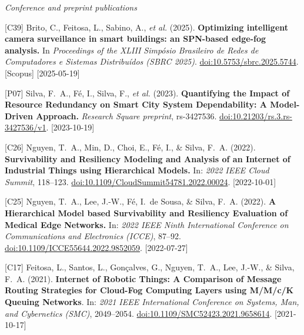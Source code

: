 {\begin{pubenumerate}
\end{pubenumerate}

\textit{Conference and preprint publications}
\begin{pubenumerate}
\item {\color{green}[C39]} Brito, C., Feitosa, L., Sabino, A., \textit{et al.} (2025). 
  \textbf{Optimizing intelligent camera surveillance in smart buildings: an SPN-based edge-fog analysis.} 
  In \textit{Proceedings of the XLIII Simp\'osio Brasileiro de Redes de Computadores e Sistemas Distribu\'idos (SBRC 2025)}. 
  \href{https://doi.org/10.5753/sbrc.2025.5744}{doi:10.5753/sbrc.2025.5744}. [Scopus] [2025-05-19]

\item {\color{blue}[P07]} Silva, F.\ A., F\'e, I., Silva, F., \textit{et al.} (2023). 
  \textbf{Quantifying the Impact of Resource Redundancy on Smart City System Dependability: A Model-Driven Approach.} 
  \textit{Research Square preprint}, rs-3427536. 
  \href{https://doi.org/10.21203/rs.3.rs-3427536/v1}{doi:10.21203/rs.3.rs-3427536/v1}. [2023-10-19]

\item {\color{green}[C26]} Nguyen, T.\ A., Min, D., Choi, E., F\'e, I., \& Silva, F.\ A. (2022). \textbf{Survivability and Resiliency Modeling and Analysis of an Internet of Industrial Things using Hierarchical Models.} In: \textit{2022 IEEE Cloud Summit}, 118--123. \href{https://doi.org/10.1109/CloudSummit54781.2022.00024}{doi:10.1109/CloudSummit54781.2022.00024}. [2022-10-01]

\item {\color{green}[C25]} Nguyen, T.\ A., Lee, J.-W., F\'e, I.\ de Sousa, \& Silva, F.\ A. (2022). \textbf{A Hierarchical Model based Survivability and Resiliency Evaluation of Medical Edge Networks.} In: \textit{2022 IEEE Ninth International Conference on Communications and Electronics (ICCE)}, 87--92. \href{https://doi.org/10.1109/ICCE55644.2022.9852059}{doi:10.1109/ICCE55644.2022.9852059}. [2022-07-27]

\item {\color{green}[C17]} Feitosa, L., Santos, L., Gon\c{c}alves, G., Nguyen, T.\ A., Lee, J.-W., \& Silva, F.\ A. (2021). \textbf{Internet of Robotic Things: A Comparison of Message Routing Strategies for Cloud-Fog Computing Layers using M/M/c/K Queuing Networks}. In: \textit{2021 IEEE International Conference on Systems, Man, and Cybernetics (SMC)}, 2049--2054. \href{https://doi.org/10.1109/SMC52423.2021.9658614}{doi:10.1109/SMC52423.2021.9658614}. [2021-10-17]


\end{pubenumerate}}
